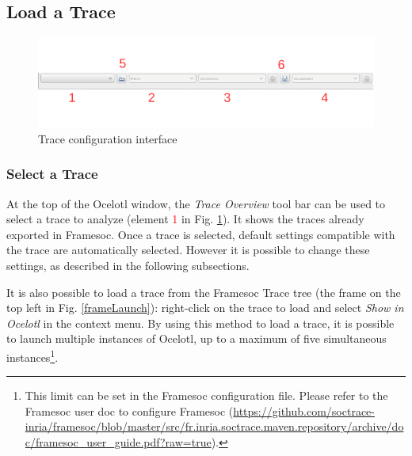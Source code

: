\documentclass[twoside]{article}
\begin{document}
\begin{sloppypar}
\subsection{Load a Trace}
\begin{figure}[h!]
	\centering
	\includegraphics[width=\textwidth]{images/traceSelection_labeled.pdf}
	\caption{Trace configuration interface}
	\label{traceConf}
\end{figure}

\subsubsection{Select a Trace}

At the top of the Ocelotl window, the \textit{Trace Overview} tool bar can be used to select a trace to analyze (element \textcolor{red}{1} in Fig. \ref{traceConf}). It shows the traces already exported in Framesoc. Once a trace is selected, default settings compatible with the trace are automatically selected. However it is possible to change these settings, as described in the following subsections. 

It is also possible to load a trace from the Framesoc Trace tree (the frame on the top left in Fig. \ref{frameLaunch}): right-click on the trace to load and select \textit{Show in Ocelotl} in the context menu. By using this method to load a trace, it is possible to launch multiple instances of Ocelotl, up to a maximum of five simultaneous instances\footnote{This limit can be set in the Framesoc configuration file. Please refer to the Framesoc user doc to configure Framesoc (\url{https://github.com/soctrace-inria/framesoc/blob/master/src/fr.inria.soctrace.maven.repository/archive/doc/framesoc_user_guide.pdf?raw=true}).}.


\end{sloppypar}
\end{document}
